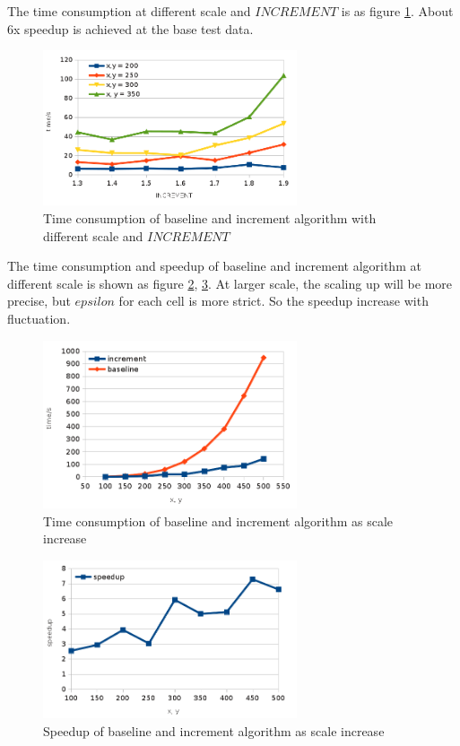 \documentclass{acm_proc_article-sp}
\begin{document}
The time consumption at different scale and $INCREMENT$ is as figure \ref{differentscaledifferentfactortime}. About 6x speedup is achieved at the base test data.

\begin{figure}[htbp]
\centering 
\includegraphics[width=7.5cm]{differentscaledifferentfactortime.png}
\caption{Time consumption of baseline and increment algorithm with different scale and $INCREMENT$}
\label{differentscaledifferentfactortime} 
\end{figure}

The time consumption and speedup of baseline and increment algorithm at different scale is shown as figure \ref{scaleIncrementTimeConsumption}, \ref{scaleIncrementSpeedup}. 
At larger scale, the scaling up will be more precise, but $epsilon$ for each cell is more strict. So the speedup increase with fluctuation.

\begin{figure}[htbp]
\centering 
\includegraphics[width=7.5cm]{scaleIncrementTimeConsumption.png}
\caption{Time consumption of baseline and increment algorithm as scale increase}
\label{scaleIncrementTimeConsumption} 
\end{figure}

\begin{figure}[htbp]
\centering 
\includegraphics[width=7.5cm]{scaleIncrementSpeedup.png}
\caption{Speedup of baseline and increment algorithm as scale increase}
\label{scaleIncrementSpeedup} 
\end{figure}
\end{document}
